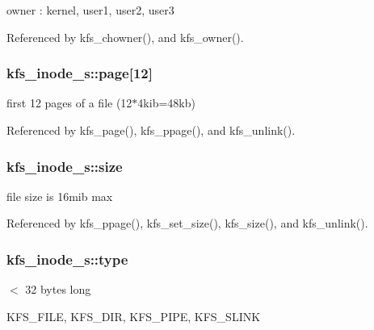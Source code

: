 owner \-: kernel, user1, user2, user3 



Referenced by kfs\-\_\-chowner(), and kfs\-\_\-owner().

\hypertarget{structkfs__inode__s_aea74f0e1495f40cf25e36f8963b84e8b}{
\subsubsection[{page}]{ kfs\-\_\-inode\-\_\-s\-::page\mbox{[}12\mbox{]}}}\label{structkfs__inode__s_aea74f0e1495f40cf25e36f8963b84e8b}


first 12 pages of a file (12$\ast$4kib=48kb) 



Referenced by kfs\-\_\-page(), kfs\-\_\-ppage(), and kfs\-\_\-unlink().

\hypertarget{structkfs__inode__s_ae4c3aa6d76cc8e92a9b29c2b3707f473}{
\subsubsection[{size}]{ kfs\-\_\-inode\-\_\-s\-::size}}\label{structkfs__inode__s_ae4c3aa6d76cc8e92a9b29c2b3707f473}


file size is 16mib max 



Referenced by kfs\-\_\-ppage(), kfs\-\_\-set\-\_\-size(), kfs\-\_\-size(), and kfs\-\_\-unlink().

\hypertarget{structkfs__inode__s_ac894cd2c4c9d7e6409c3302d1edec307}{
\subsubsection[{type}]{ kfs\-\_\-inode\-\_\-s\-::type}}\label{structkfs__inode__s_ac894cd2c4c9d7e6409c3302d1edec307}


$<$ 32 bytes long 

K\-F\-S\-\_\-\-F\-I\-L\-E, K\-F\-S\-\_\-\-D\-I\-R, K\-F\-S\-\_\-\-P\-I\-P\-E, K\-F\-S\-\_\-\-S\-L\-I\-N\-K 

